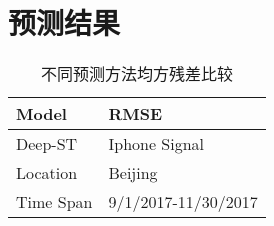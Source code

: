\section{预测结果}
\begin{table}
\centering
\caption{不同预测方法均方残差比较}
\label{table:RSME}
\begin{tabular}{p{}|p{}}
\hline
\hline
\textbf{Model} & \textbf{RMSE}\\
\hline
Deep-ST& Iphone Signal\\
\hline
Location & Beijing\\
\hline
Time Span & 9/1/2017-11/30/2017\\
\hline
\hline


\end{tabular}
\end{table}

